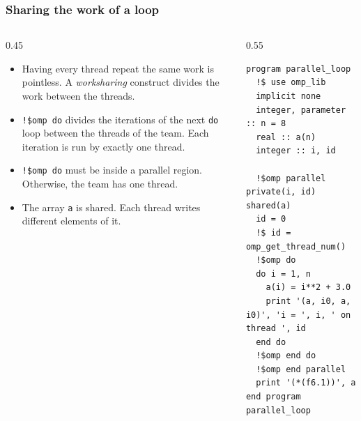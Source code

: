 \begin{frame}[fragile]
  \frametitle{Sharing the work of a loop}
  \begin{columns}[T]
    \begin{column}{0.45\textwidth}
      \begin{itemize}
        \item Having every thread repeat the same work is pointless. A \emph{worksharing} construct divides the work between the threads.
        \item \texttt{!\$omp do} divides the iterations of the next \texttt{do} loop between the threads of the team. Each iteration is run by exactly one thread.
        \item \texttt{!\$omp do} must be inside a parallel region. Otherwise, the team has one thread.
        \item The array \texttt{a} is shared. Each thread writes different elements of it.
      \end{itemize}
    \end{column}

    \begin{column}{0.55\textwidth}
      \begin{lstlisting}
program parallel_loop
  !$ use omp_lib
  implicit none
  integer, parameter :: n = 8
  real :: a(n)
  integer :: i, id

  !$omp parallel private(i, id) shared(a)
  id = 0
  !$ id = omp_get_thread_num()
  !$omp do
  do i = 1, n
    a(i) = i**2 + 3.0
    print '(a, i0, a, i0)', 'i = ', i, ' on thread ', id
  end do
  !$omp end do
  !$omp end parallel
  print '(*(f6.1))', a
end program parallel_loop
      \end{lstlisting}
    \end{column}
  \end{columns}
\end{frame}


